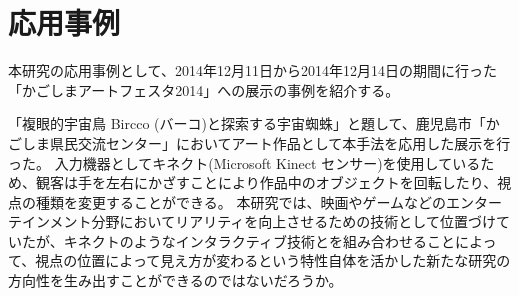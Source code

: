 \newpage
\section{応用事例}
\label{SKagoshima}

本研究の応用事例として、2014年12月11日から2014年12月14日の期間に行った「かごしまアートフェスタ2014」への展示の事例を紹介する。

「複眼的宇宙鳥 Bircco (バーコ)と探索する宇宙蜘蛛」と題して、鹿児島市「かごしま県民交流センター」においてアート作品として本手法を応用した展示を行った。
入力機器としてキネクト(Microsoft Kinect センサー)を使用しているため、観客は手を左右にかざすことにより作品中のオブジェクトを回転したり、視点の種類を変更することができる。
本研究では、映画やゲームなどのエンターテインメント分野においてリアリティを向上させるための技術として位置づけていたが、キネクトのようなインタラクティブ技術とを組み合わせることによって、視点の位置によって見え方が変わるという特性自体を活かした新たな研究の方向性を生み出すことができるのではないだろうか。




